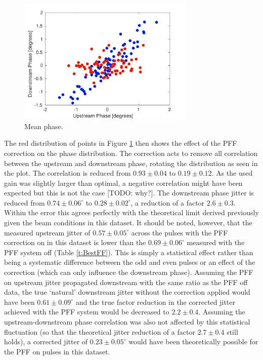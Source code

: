 \begin{figure}
  \centering
  \includegraphics[width=0.75\textwidth]{Figures/feedforward/BestFF_Real}
  \caption{Mean phase.}
  \label{f:BestFF_Real}
\end{figure}

The red distribution of points in Figure \ref{f:BestFF_Real} then shows the effect of the PFF correction on the phase distribution. The correction acts to remove all correlation between the upstream and downstream phase, rotating the distribution as seen in the plot. The correlation is reduced from \(0.93\pm0.04\) to \(0.19\pm0.12\). As the used gain was slightly larger than optimal, a negative correlation might have been expected but this is not the case [TODO: why?]. The downstream phase jitter is reduced from \(0.74\pm0.06^\circ\) to \(0.28\pm0.02^\circ\), a reduction of a factor \(2.6\pm0.3\).  Within the error this agrees perfectly with the theoretical limit derived previously given the beam conditions in this dataset. It should be noted, however, that the measured upstream jitter of \(0.57\pm0.05^\circ\) across the pulses with the PFF correction on in this dataset is lower than the \(0.69\pm0.06^\circ\) measured with the PFF system off (Table \ref{t:BestFF}). This is simply a statistical effect rather than being a systematic difference between the odd and even pulses or an effect of the correction (which can only influence the downstream phase). Assuming the PFF on upstream jitter propagated downstream with the same ratio as the PFF off data, the true `natural' downstream jitter without the correction applied would have been \(0.61\pm0.09^\circ\) and the true factor reduction in the corrected jitter achieved with the PFF system would be decreased to \(2.2\pm0.4\). Assuming the upstream-downstream phase correlation was also not affected by this statistical fluctuation (so that the theoretical jitter reduction of a factor \(2.7\pm0.4\) still holds), a corrected jitter of \(0.23\pm0.05^\circ\) would have been theoretically possible for the PFF on pulses in this dataset. 

